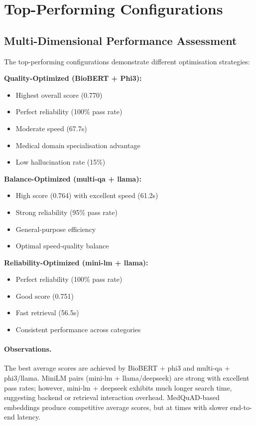\section{Top-Performing Configurations}



\subsection{Multi-Dimensional Performance Assessment}

The top-performing configurations demonstrate different optimisation strategies:

\textbf{Quality-Optimized (BioBERT + Phi3):}
\begin{itemize}
    \item Highest overall score (0.770)
    \item Perfect reliability (100\% pass rate)
    \item Moderate speed (67.7s)
    \item Medical domain specialisation advantage
    \item Low hallucination rate (15\%)
\end{itemize}

\textbf{Balance-Optimized (multi-qa + llama):}
\begin{itemize}
    \item High score (0.764) with excellent speed (61.2s)
    \item Strong reliability (95\% pass rate)
    \item General-purpose efficiency
    \item Optimal speed-quality balance
\end{itemize}

\textbf{Reliability-Optimized (mini-lm + llama):}
\begin{itemize}
    \item Perfect reliability (100\% pass rate)
    \item Good score (0.751)
    \item Fast retrieval (56.5s)
    \item Consistent performance across categories
\end{itemize}

\paragraph{Observations.} The best average scores are achieved by BioBERT + phi3 and multi-qa + phi3/llama. MiniLM pairs (mini-lm + llama/deepseek) are strong with excellent pass rates; however, mini-lm + deepseek exhibits much longer search time, suggesting backend or retrieval interaction overhead. MedQuAD-based embeddings produce competitive average scores, but at times with slower end-to-end latency.

